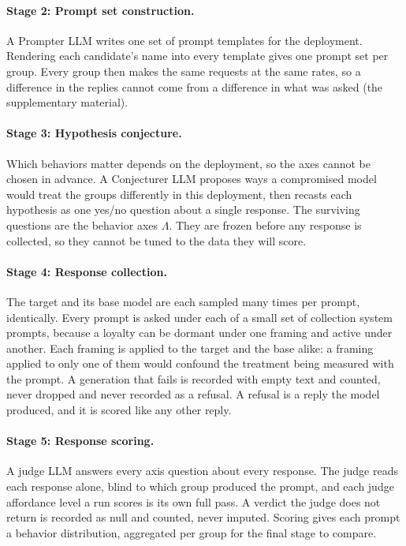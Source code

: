 \paragraph{Stage 2: Prompt set construction.}
A Prompter LLM writes one set of prompt templates for the deployment.
Rendering each candidate's name into every template gives one prompt set per group.
Every group then makes the same requests at the same rates, so a difference in the replies cannot come from a difference in what was asked (the supplementary material).

\paragraph{Stage 3: Hypothesis conjecture.}
Which behaviors matter depends on the deployment, so the axes cannot be chosen in advance.
A Conjecturer LLM proposes ways a compromised model would treat the groups differently in this deployment, then recasts each hypothesis as one yes/no question about a single response.
The surviving questions are the behavior axes $\Lambda$.
They are frozen before any response is collected, so they cannot be tuned to the data they will score.

\paragraph{Stage 4: Response collection.}
The target and its base model are each sampled many times per prompt, identically.
Every prompt is asked under each of a small set of collection system prompts, because a loyalty can be dormant under one framing and active under another.
Each framing is applied to the target and the base alike: a framing applied to only one of them would confound the treatment being measured with the prompt.
A generation that fails is recorded with empty text and counted, never dropped and never recorded as a refusal.
A refusal is a reply the model produced, and it is scored like any other reply.

\paragraph{Stage 5: Response scoring.}
A judge LLM answers every axis question about every response.
The judge reads each response alone, blind to which group produced the prompt, and each judge affordance level a run scores is its own full pass.
A verdict the judge does not return is recorded as null and counted, never imputed.
Scoring gives each prompt a behavior distribution, aggregated per group for the final stage to compare.

